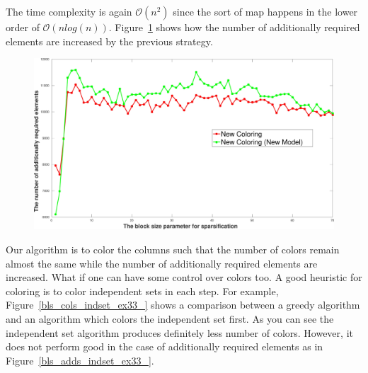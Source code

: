 \documentclass[12pt, twoside]{book}
\newcommand{\figref}[1]{Figure~\protect\ref{#1}}
\begin{document}
The time complexity is again $\mathcal{O}(n^2)$ since the sort of map happens in the lower order of
$\mathcal{O}(nlog(n))$.
\figref{bls_add_ex33_compare_max} shows how the number of additionally required elements are increased
by the previous strategy.
\begin{figure}
\centering
\includegraphics[width=0.9\linewidth]{bls_add_ex33_compare_max}
\label{bls_add_ex33_compare_max}
\end{figure}

Our algorithm is to color the columns such that the number of colors
remain almost the same while the number of additionally required elements are increased.
What if one can have some control over colors too.
A good heuristic for coloring is to color independent sets in each step.
For example, \figref{bls_cols_indset_ex33_} shows a comparison between a greedy algorithm and
an algorithm which colors the independent set first. As you can see the independent set algorithm
produces definitely less number of colors. However, it does not perform good in the case of additionally
required elements as in \figref{bls_adds_indset_ex33_}.
\end{document}
